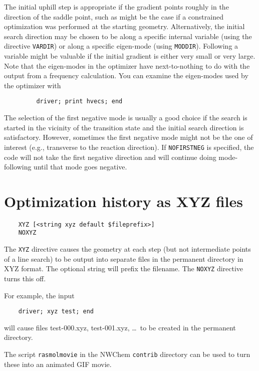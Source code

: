 The initial uphill step is appropriate if the gradient points roughly
in the direction of the saddle point, such as might be the case if a
constrained optimization was performed at the starting geometry.
Alternatively, the initial search direction may be chosen to be along
a specific internal variable (using the directive
\verb+VARDIR+) or along a specific eigen-mode (using \verb+MODDIR+).
Following a variable might be valuable if the initial gradient is
either very small or very large.  Note that the eigen-modes in the
optimizer have next-to-nothing to do with the output from a frequency
calculation.  You can examine the eigen-modes used by the optimizer
with

\begin{verbatim}
         driver; print hvecs; end
\end{verbatim}

The selection of the first negative mode is usually a good choice if
the search is started in the vicinity of the transition state and the
initial search direction is satisfactory.  However, sometimes the
first negative mode might not be the one of interest (e.g., transverse
to the reaction direction).  If \verb+NOFIRSTNEG+ is specified, the
code will not take the first negative direction and will continue doing
mode-following until that mode goes negative.

\section{Optimization history as XYZ files}

\begin{verbatim}
    XYZ [<string xyz default $fileprefix>]
    NOXYZ
\end{verbatim}

The \verb+XYZ+ directive causes the geometry at each step (but not
intermediate points of a line search) to be output into separate files
in the permanent directory in XYZ format.  The optional string will
prefix the filename.  The \verb+NOXYZ+ directive turns this off.

For example, the input
\begin{verbatim}
    driver; xyz test; end
\end{verbatim}
will cause files test-000.xyz, test-001.xyz, \ldots\ to be created
in the permanent directory.  

The script \verb+rasmolmovie+ in the NWChem \verb+contrib+ directory
can be used to turn these into an animated GIF movie.

